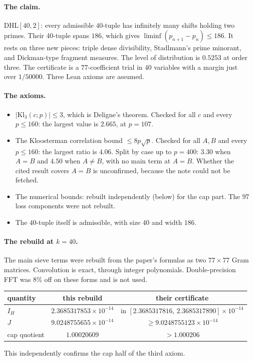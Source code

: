 \paragraph{The claim.} DHL$[40,2]$: every admissible $40$-tuple has infinitely many shifts holding two primes. Their $40$-tuple spans $186$, which gives $\liminf(p_{n+1}-p_n)\le186$. It rests on three new pieces: triple dense divisibility, Stadlmann's prime minorant, and Dickman-type fragment measures. The level of distribution is $0.5253$ at order three. The certificate is a $77$-coefficient trial in $40$ variables with a margin just over $1/50000$. Three Lean axioms are assumed.

\paragraph{The axioms.} 
\begin{itemize}
\item $|\mathrm{Kl}_3(c;p)|\le3$, which is Deligne's theorem. Checked for all $c$ and every $p\le160$: the largest value is $2.665$, at $p=107$.
\item The Kloosterman correlation bound $\le8p\sqrt p$. Checked for all $A,B$ and every $p\le160$: the largest ratio is $4.06$. Split by case up to $p=400$: $3.30$ when $A=B$ and $4.50$ when $A\neq B$, with no main term at $A=B$. Whether the cited result covers $A=B$ is unconfirmed, because the note could not be fetched.
\item The numerical bounds: rebuilt independently (below) for the cap part. The $97$ loss components were not rebuilt.
\item The $40$-tuple itself is admissible, with size $40$ and width $186$.
\end{itemize}

\paragraph{The rebuild at $k=40$.} 
The main sieve terms were rebuilt from the paper's formulas as two $77\times77$ Gram matrices. Convolution is exact, through integer polynomials. Double-precision FFT was $8\%$ off on these forms and is not used.
\begin{center}\begin{tabular}{lcc}
\toprule
quantity & this rebuild & their certificate\\
\midrule
$I_H$ & $2.3685317853\times10^{-14}$ & in $[2.3685317816,\,2.3685317890]\times10^{-14}$\\
$J$ & $9.0248755655\times10^{-14}$ & $\ge9.0248755123\times10^{-14}$\\
cap quotient & $1.00020609$ & $>1.000206$\\
\bottomrule
\end{tabular}\end{center}
This independently confirms the cap half of the third axiom.

